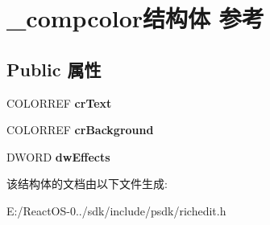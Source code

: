 \hypertarget{struct__compcolor}{}\section{\+\_\+compcolor结构体 参考}
\label{struct__compcolor}
\subsection*{Public 属性}
\begin{DoxyCompactItemize}
\item 
\mbox{\label{struct__compcolor_a2454ef7241f440783e38afb80e06720b}} 
C\+O\+L\+O\+R\+R\+EF {\bfseries cr\+Text}
\item 
\mbox{\label{struct__compcolor_a646593a51302682f562dc7e5c11f893c}} 
C\+O\+L\+O\+R\+R\+EF {\bfseries cr\+Background}
\item 
\mbox{\label{struct__compcolor_aac969ad968d79187757141941e078f46}} 
D\+W\+O\+RD {\bfseries dw\+Effects}
\end{DoxyCompactItemize}


该结构体的文档由以下文件生成\+:\begin{DoxyCompactItemize}
\item 
E\+:/\+React\+O\+S-\/0../sdk/include/psdk/richedit.\+h\end{DoxyCompactItemize}
